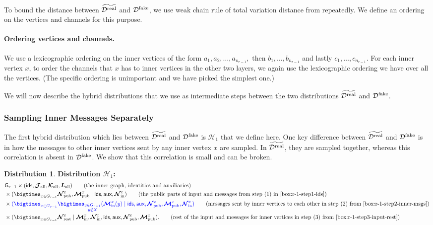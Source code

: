 \documentclass[11pt]{article}
\theoremstyle{definition}
\newtheorem{mddistribution}{Distribution}
\newenvironment{Distribution}{\begin{tbox}\begin{mddistribution}}{\end{mddistribution}\end{tbox}}
\newenvironment{tbox}{\begin{tcolorbox}[
		enlarge top by=5pt,
		enlarge bottom by=5pt,
		 breakable,
		 boxsep=0pt,
                  left=4pt,
                  right=4pt,
                  top=10pt,
                  arc=4pt,
                  boxrule=1pt,toprule=1pt,
                  colback=white
                  ]%
	}
{\end{tcolorbox}}
\newcommand{\rv}[1]{\ensuremath{{\mathsf{#1}}}\xspace}
\newcounter{mybox}
\renewcommand{\themybox}{\arabic{mybox}}
\newcommand{\namethebox}{\begin{center}\textbf{Box~\themybox} \end{center}}
\newcommand{\rNinner}[2]{\ensuremath{\bm{\mathcal{N}}_{\textnormal{in}}^{#1_{#2}}}}
\newcommand{\cH}{\ensuremath{\mathcal{H}}}
\newcommand{\cD}{\ensuremath{\mathcal{D}}}
\newcommand{\cDreal}{\ensuremath{\cD^{\textnormal{real}}}}
\newcommand{\cDrealtil}{\ensuremath{\widetilde{\cDreal}}}
\newcommand{\cDfake}{\ensuremath{\cD^{\textnormal{fake}}}}
\newcommand{\raux}{\ensuremath{\rv{aux}}}
\newcommand{\rcJall}{\ensuremath{\bm{\mathcal{J}}_{\textnormal{all}}}}
\newcommand{\rcKall}{\ensuremath{\bm{\mathcal{K}}_{\textnormal{all}}}}
\newcommand{\rLall}{\ensuremath{\bm{L}_{\textnormal{all}}}}
\newcommand{\rNpub}[1]{\ensuremath{\bm{\mathcal{N}}_{\textnormal{pub}}^{#1}}}
\newcommand{\rMpub}[1]{\ensuremath{\bm{\mathcal{M}}_{\textnormal{pub}}^{#1}}}
\newcommand{\rMinner}[1]{\ensuremath{\bm{\mathcal{M}}_{\textnormal{in}}^{#1}}}
\newcommand{\rNrest}[1]{\ensuremath{\bm{\mathcal{N}}^{#1}_{\textnormal{rest}}}}
\newcommand{\rG}{\ensuremath{\rv{G}}}
\newcommand{\rids}{\ensuremath{\rv{ids}}}
\begin{document}
To bound the distance between $\cDrealtil$ and $\cDfake$, we use weak chain rule of total variation distance from  repeatedly. We define an ordering on the vertices and channels for this purpose. 

\paragraph{Ordering vertices and channels.}
We use a lexicographic ordering on the inner vertices of the form $a_1, a_2, \ldots, a_{n_{r-1}},$ then $b_1, \ldots, b_{n_{r-1}}$ and lastly $c_{1}, \ldots, c_{n_{r-1}}$. For each inner vertex $x$, to order the channels that $x$ has to inner vertices in the other two layers, we again use the lexicographic ordering we have over all the vertices. 
(The specific ordering is unimportant and we have picked the simplest one.)

We will now describe the hybrid distributions that we use as intermediate steps between the two distributions $\cDrealtil$ and $\cDfake$. 

\subsubsection*{Sampling Inner Messages Separately}

The first hybrid distribution which lies between $\cDrealtil$ and $\cDfake$ is $\cH_1$ that we define here.
One key difference between $\cDrealtil$ and $\cDfake$ is in how the messages to other inner vertices sent by any inner vertex $x$ are sampled. In $\cDrealtil$, they are sampled together, whereas this correlation is absent in $\cDfake$. We show that this correlation is small and can be broken. 

\begin{Distribution}\label{box:hybrid1-inner-msgs}
	\textbf{Distribution $\cH_1$:}
	\begin{align*}
		&\rG_{r-1} \times (\rids, \rcJall, \rcKall, \rLall) \tag{the inner graph, identities and auxiliaries}\\
			&\times (\bigtimes_{x \in G_{r-1}} \rNpub{x}, \rMpub{x} \mid \rids, \raux, \rNinner{x}{}) \tag{the public parts of input and messages from step (1) in \Cref{box:r-1-step1-ids}} \\
		&\times \eqcolor{(\bigtimes_{x \in G_{r-1}} \bigtimes_{\substack{y \in G_{r-1} \\y \notin X}} (\rMinner{x}(y) \mid  \rids, \raux, \rNpub{x}, \rMpub{x}, \rNinner{x}{})}   \tag{messages sent by inner vertices to each other in step (2) from \Cref{box:r-1-step2-inner-msgs}} \\
		&\times (\bigtimes_{x \in G_{r-1}}  \rNrest{x} \mid \rMinner{x}, \rNinner{x}{}, \rids, \raux, \rNpub{x}, \rMpub{x}). \tag{rest of the input and messages for inner vertices in step (3) from \Cref{box:r-1-step3-input-rest}}
	\end{align*}
\end{Distribution}
\end{document}
